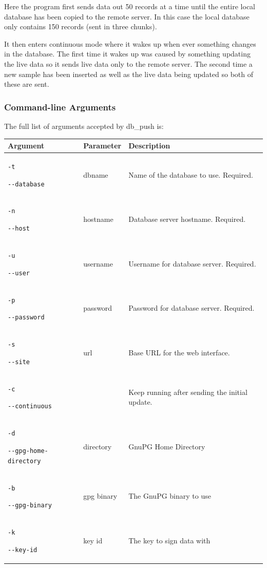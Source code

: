 \documentclass[a4paper,10pt,draft]{book}
\begin{document}
Here the program first sends data out 50 records at a time until the entire local database has been copied to the remote server. In this case the local database only contains 150 records (sent in three chunks).

It then enters continuous mode where it wakes up when ever something changes in the database. The first time it wakes up was caused by something updating the live data so it sends live data only to the remote server. The second time a new sample has been inserted as well as the live data being updated so both of these are sent.

\subsubsection{Command-line Arguments}
The full list of arguments accepted by db\_push is:

\begin{tabular}{p{4.2cm} l p{7.9cm}}
\hline
\textbf{Argument} & \textbf{Parameter} & \textbf{Description} \\
\hline
\verb|-t| \par \verb|--database| & dbname & Name of the database to use. Required. \\
\verb|-n| \par \verb|--host| & hostname & Database server hostname. Required. \\
\verb|-u| \par \verb|--user| & username & Username for database server. Required. \\
\verb|-p| \par \verb|--password| & password & Password for database server. Required. \\

\verb|-s| \par \verb|--site| & url & Base URL for the web interface. \\

\verb|-c| \par \verb|--continuous| & & Keep running after sending the initial update. \\

\verb|-d| \par \verb|--gpg-home-directory| & directory & GnuPG Home Directory \\

\verb|-b| \par \verb|--gpg-binary| & gpg binary & The GnuPG binary to use \\

\verb|-k| \par \verb|--key-id| & key id & The key to sign data with \\
\hline
\end{tabular}
\end{document}
